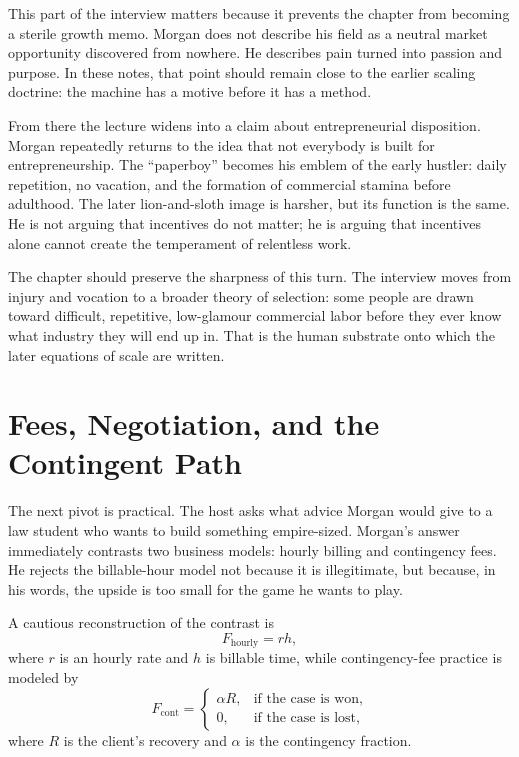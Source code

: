 This part of the interview matters because it prevents the chapter from becoming a sterile growth memo. Morgan does not describe his field as a neutral market opportunity discovered from nowhere. He describes pain turned into passion and purpose. In these notes, that point should remain close to the earlier scaling doctrine: the machine has a motive before it has a method.

From there the lecture widens into a claim about entrepreneurial disposition. Morgan repeatedly returns to the idea that not everybody is built for entrepreneurship. The ``paperboy'' becomes his emblem of the early hustler: daily repetition, no vacation, and the formation of commercial stamina before adulthood. The later lion-and-sloth image is harsher, but its function is the same. He is not arguing that incentives do not matter; he is arguing that incentives alone cannot create the temperament of relentless work.

The chapter should preserve the sharpness of this turn. The interview moves from injury and vocation to a broader theory of selection: some people are drawn toward difficult, repetitive, low-glamour commercial labor before they ever know what industry they will end up in. That is the human substrate onto which the later equations of scale are written.

\section{Fees, Negotiation, and the Contingent Path}

The next pivot is practical. The host asks what advice Morgan would give to a law student who wants to build something empire-sized. Morgan's answer immediately contrasts two business models: hourly billing and contingency fees. He rejects the billable-hour model not because it is illegitimate, but because, in his words, the upside is too small for the game he wants to play.

A cautious reconstruction of the contrast is
\begin{equation}
F_{\mathrm{hourly}} = r h,
\end{equation}
where \(r\) is an hourly rate and \(h\) is billable time, while contingency-fee practice is modeled by
\begin{equation}
F_{\mathrm{cont}} =
\begin{cases}
\alpha R, & \text{if the case is won},\\[4pt]
0, & \text{if the case is lost},
\end{cases}
\end{equation}
where \(R\) is the client's recovery and \(\alpha\) is the contingency fraction.

